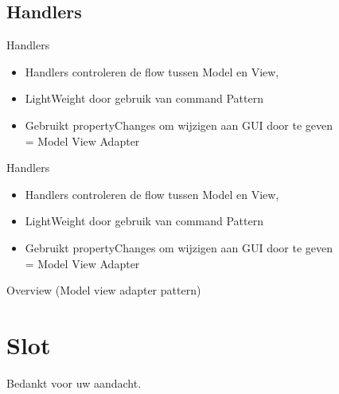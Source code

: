 \documentclass[11pt,t]{beamer}
\begin{document}
\subsection{Handlers}

\begin{frame}{Handlers}
\begin{itemize}
\item Handlers controleren de flow tussen Model en View,
\item LightWeight door gebruik van command Pattern
\item Gebruikt propertyChanges om wijzigen aan GUI door te geven \\
= Model View Adapter
\end{itemize}
\end{frame}

\begin{frame}{Handlers}
\begin{itemize}
\item Handlers controleren de flow tussen Model en View,
\item LightWeight door gebruik van command Pattern
\item Gebruikt propertyChanges om wijzigen aan GUI door te geven \\
= Model View Adapter
\end{itemize}
\end{frame}

\begin{frame}{Overview (Model view adapter pattern)}

\end{frame}
\section{Slot}
\begin{frame}
\vspace{1.5in}
\begin{center}
Bedankt voor uw aandacht.
\end{center}
\end{frame}
\end{document}
